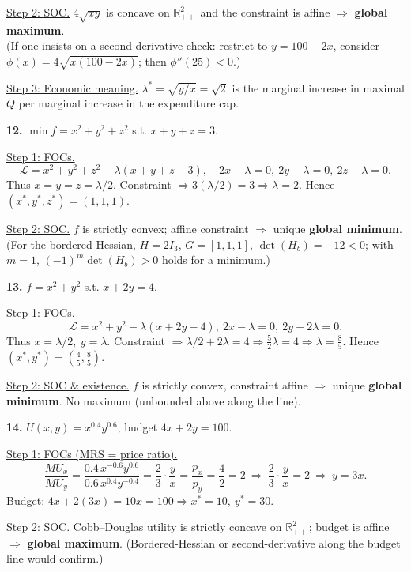 \documentclass[12pt]{article}
\begin{document}
\underline{Step 2: SOC.} $4\sqrt{xy}$ is concave on $\mathbb{R}_{++}^2$ and the constraint is affine $\Rightarrow$ \textbf{global maximum}.\\
(If one insists on a second-derivative check: restrict to $y=100-2x$, consider $\phi(x)=4\sqrt{x(100-2x)}$; then $\phi''(25)<0$.)

\underline{Step 3: Economic meaning.} $\lambda^\ast=\sqrt{y/x}=\sqrt{2}$ is the marginal increase in maximal $Q$ per marginal increase in the expenditure cap.

\medskip

\textbf{12.} $\min f=x^2+y^2+z^2$ s.t. $x+y+z=3$.

\underline{Step 1: FOCs.}
\[
\mathcal{L}=x^2+y^2+z^2-\lambda(x+y+z-3),\quad
2x-\lambda=0,\ 2y-\lambda=0,\ 2z-\lambda=0.
\]
Thus $x=y=z=\lambda/2$. Constraint $\Rightarrow 3(\lambda/2)=3\Rightarrow \lambda=2$.
Hence $(x^\ast,y^\ast,z^\ast)=(1,1,1)$.

\underline{Step 2: SOC.} $f$ is strictly convex; affine constraint $\Rightarrow$ unique \textbf{global minimum}.\\
(For the bordered Hessian, $H=2I_3$, $G=[1,1,1]$, $\det(H_b)=-12<0$; with $m=1$, $(-1)^m\det(H_b)>0$ holds for a minimum.)

\medskip

\textbf{13.} $f=x^2+y^2$  s.t.  $x+2y=4$.

\underline{Step 1: FOCs.}
\[
\mathcal{L}=x^2+y^2-\lambda(x+2y-4),\ 
2x-\lambda=0,\ 2y-2\lambda=0.
\]
Thus $x=\lambda/2,\ y=\lambda$. Constraint $\Rightarrow \lambda/2+2\lambda=4\Rightarrow \tfrac{5}{2}\lambda=4\Rightarrow \lambda=\tfrac{8}{5}$.
Hence $(x^\ast,y^\ast)=(\tfrac{4}{5},\tfrac{8}{5})$.

\underline{Step 2: SOC \& existence.} $f$ is strictly convex, constraint affine $\Rightarrow$ unique \textbf{global minimum}. No maximum (unbounded above along the line).

\medskip

\textbf{14.} $U(x,y)=x^{0.4}y^{0.6}$, budget $4x+2y=100$.

\underline{Step 1: FOCs (MRS = price ratio).}
\[
\frac{MU_x}{MU_y}=\frac{0.4\,x^{-0.6}y^{0.6}}{0.6\,x^{0.4}y^{-0.4}}
=\frac{2}{3}\cdot \frac{y}{x}
=\frac{p_x}{p_y}=\frac{4}{2}=2
\ \Rightarrow\ \frac{2}{3}\cdot \frac{y}{x}=2\ \Rightarrow\ y=3x.
\]
Budget: $4x+2(3x)=10x=100\Rightarrow x^\ast=10,\ y^\ast=30$.

\underline{Step 2: SOC.} Cobb–Douglas utility is strictly concave on $\mathbb{R}_{++}^2$; budget is affine $\Rightarrow$ \textbf{global maximum}. (Bordered-Hessian or second-derivative along the budget line would confirm.)
\end{document}
